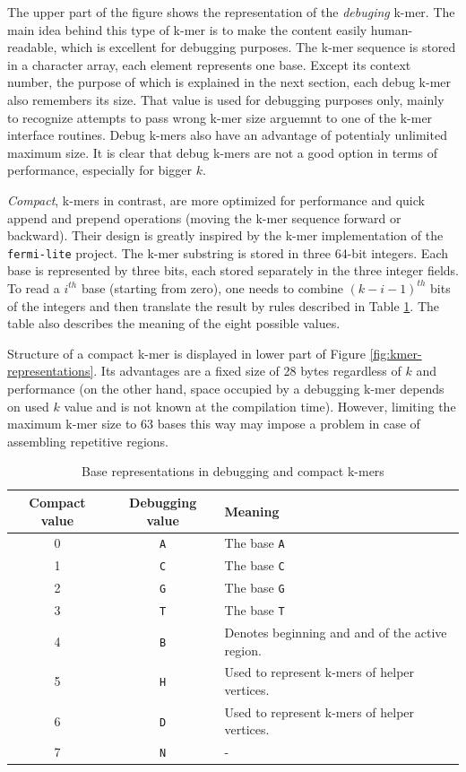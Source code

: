 The upper part of the figure shows the representation of the \textit{debuging} k-mer. The main idea behind this type of k-mer is to make the content easily human-readable, which is excellent for debugging purposes. The k-mer sequence is stored in a character array, each element represents one base. Except its context number, the purpose of which is explained in the next section, each debug k-mer also remembers its size. That value is used for debugging purposes only, mainly to recognize attempts to pass wrong k-mer size arguemnt to one of the k-mer interface routines. Debug k-mers also have an advantage of potentialy unlimited maximum size. It is clear that debug k-mers are not a good option in terms of performance, especially for bigger $k$.

\textit{Compact}, k-mers in contrast,  are more optimized for performance and quick append and prepend operations (moving the k-mer sequence forward or backward). Their design is greatly inspired by the k-mer implementation of the \texttt{fermi-lite} project. The k-mer substring is stored in three 64-bit integers. Each base is represented by three bits, each stored separately in  the three integer fields. To read a $i^{th}$ base (starting from zero), one needs to combine $(k-i-1)^{th}$ bits of the integers and then translate the result by rules described in Table \ref{tab:base-translation}. The table also describes the meaning of the eight possible values.

Structure of a compact k-mer is displayed in lower part of Figure \ref{fig:kmer-representations}. Its advantages are a fixed size of 28 bytes regardless of $k$ and performance (on the other hand, space occupied by a debugging k-mer depends on used $k$ value and is not known at the compilation time). However, limiting the maximum k-mer size to 63 bases this way may impose a problem in case of assembling repetitive regions.

\begin{table}[h]
\begin{center}
\caption{Base representations in debugging and compact k-mers}
\label{tab:base-translation}
\begin{tabular}{| c | c | p{5cm} |}
\hline
Compact value & Debugging value & Meaning \\
\hline
0 & \texttt{A} & The base \texttt{A} \\
\hline
1 & \texttt{C} & The base \texttt{C} \\
\hline
2 & \texttt{G} & The base \texttt{G} \\
\hline
3 & \texttt{T} & The base \texttt{T} \\
\hline
4 & \texttt{B} & Denotes beginning and and of the active region. \\
\hline
5 & \texttt{H} & Used to represent k-mers of helper vertices. \\
\hline
6 & \texttt{D} & Used to represent k-mers of helper vertices. \\
\hline
7 & \texttt{N} & - \\
\hline
\end{tabular}
\end{center}
\end{table}

